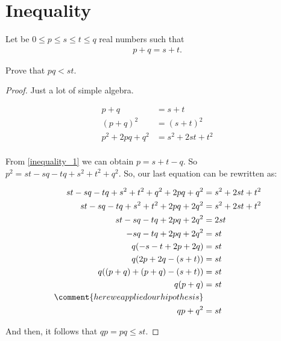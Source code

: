 ﻿\chapter{Inequality}

    \begin{problem}
        Let be $0 \leq p \leq s \leq t \leq q$ real numbers such that
        \begin{align}\label{inequality_1}
            p + q = s + t.
        \end{align}
        
        Prove that $pq < st$.
    \end{problem}
    
    \begin{proof}
        Just a lot of simple algebra.
        
        \begin{align}
            p + q               &=      s + t                   \\
            (p + q)^2           &=      (s + t)^2               \\
            p^2 + 2pq + q^2     &=      s^2 + 2st + t^2         \\
        \end{align}
        
        From \eqref{inequality_1} we can obtain $p = s + t - q$. So
        $p^2 = st - sq - tq + s^2 + t^2 + q^2$. So, our last equation can
        be rewritten as:
        
        \begin{align}
            st - sq - tq + s^2 + t^2 + q^2 + 2pq + q^2      &=      s^2 + 2st + t^2         \\         
            st - sq - tq + s^2 + t^2 + 2pq + 2q^2           &=      s^2 + 2st + t^2         \\         
            st - sq - tq + 2pq + 2q^2                       &=      2st                     \\         
            - sq - tq + 2pq + 2q^2                          &=      st                      \\         
            q (- s - t + 2p + 2q)                           &=      st                      \\         
            q (2p + 2q - (s + t))                           &=      st                      \\         
            q ((p + q) + (p + q) - (s + t))                 &=      st                      \\         
            q (p + q)                                       &=      st                      \\
            \comment{here we applied our hipothesis}        &                               \\                    
            qp + q^2                                        &=      st                      \\
        \end{align}
        
        And then, it follows that $qp = pq \leq st$.
    \end{proof}
    
